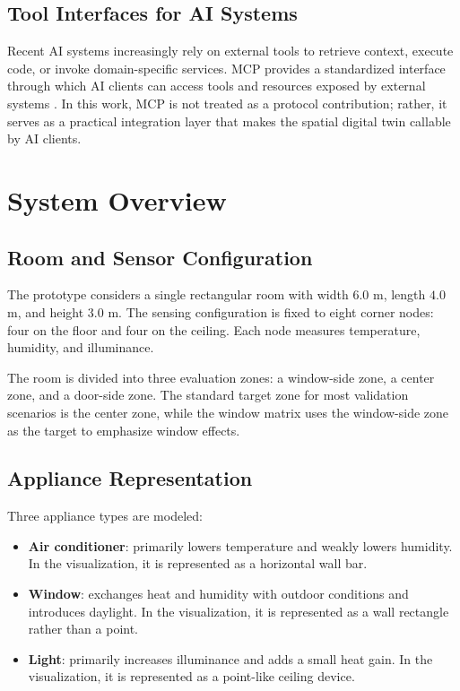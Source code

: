 \documentclass[conference]{IEEEtran}
\begin{document}
\subsection{Tool Interfaces for AI Systems}
Recent AI systems increasingly rely on external tools to retrieve context, execute code, or invoke domain-specific services. MCP provides a standardized interface through which AI clients can access tools and resources exposed by external systems \cite{mcp2025}. In this work, MCP is not treated as a protocol contribution; rather, it serves as a practical integration layer that makes the spatial digital twin callable by AI clients.

\section{System Overview}
\subsection{Room and Sensor Configuration}
The prototype considers a single rectangular room with width $6.0$ m, length $4.0$ m, and height $3.0$ m. The sensing configuration is fixed to eight corner nodes: four on the floor and four on the ceiling. Each node measures temperature, humidity, and illuminance.

The room is divided into three evaluation zones: a window-side zone, a center zone, and a door-side zone. The standard target zone for most validation scenarios is the center zone, while the window matrix uses the window-side zone as the target to emphasize window effects.

\subsection{Appliance Representation}
Three appliance types are modeled:
\begin{itemize}
\item \textbf{Air conditioner}: primarily lowers temperature and weakly lowers humidity. In the visualization, it is represented as a horizontal wall bar.
\item \textbf{Window}: exchanges heat and humidity with outdoor conditions and introduces daylight. In the visualization, it is represented as a wall rectangle rather than a point.
\item \textbf{Light}: primarily increases illuminance and adds a small heat gain. In the visualization, it is represented as a point-like ceiling device.
\end{itemize}
\end{document}
